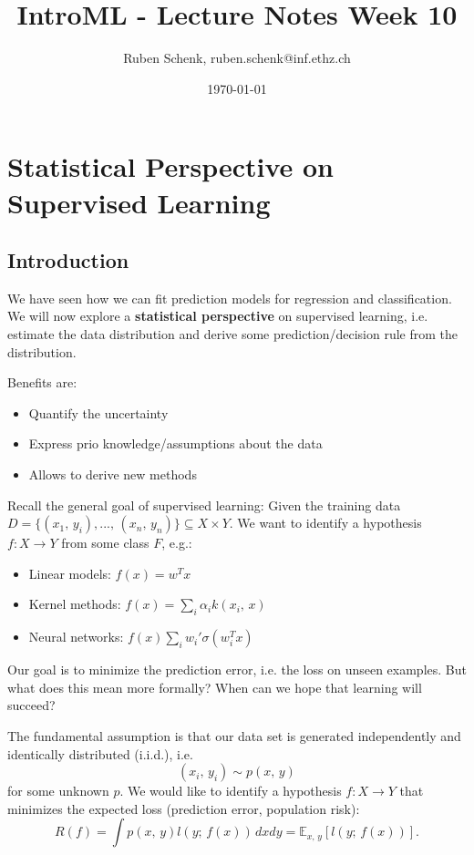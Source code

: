 \documentclass[a4paper]{extarticle}
\title{IntroML - Lecture Notes Week 10}
\author{Ruben Schenk, ruben.schenk@inf.ethz.ch}
\date{\today}
\begin{document}
\maketitle

\section{Statistical Perspective on Supervised Learning}

\subsection{Introduction}

We have seen how we can fit prediction models for regression and classification. We will now explore a \textbf{statistical perspective} on supervised learning, i.e. estimate the data distribution and derive some prediction/decision rule from the distribution.

Benefits are:
\begin{itemize}
    \item Quantify the uncertainty
    \item Express prio knowledge/assumptions about the data
    \item Allows to derive new methods
\end{itemize}

Recall the general goal of supervised learning: Given the training data $D = \{(x_1, \, y_i),..., \, (x_n, \, y_n)\} \subseteq X \times Y$. We want to identify a hypothesis $f : X \to Y$ from some class $F$, e.g.:
\begin{itemize}
    \item Linear models: $f(x) = w^Tx$
    \item Kernel methods: $f(x) = \sum_i \alpha_i k(x_i, \, x)$
    \item Neural networks: $f(x) \sum_i w_i' \sigma(w_i^T x)$
\end{itemize}
Our goal is to minimize the prediction error, i.e. the loss on unseen examples. But what does this mean more formally? When can we hope that learning will succeed?

The fundamental assumption is that our data set is generated independently and identically distributed (i.i.d.), i.e.
\[
    (x_i, \, y_i) \sim p(x, \, y)
\]
for some unknown $p$. We would like to identify a hypothesis $f: X \to Y$ that minimizes the expected loss (prediction error, population risk):
\[
    R(f) = \int p(x, \, y)l(y; \, f(x)) \, dxdy = \mathbb{E}_{x, \, y}[l(y; \, f(x))].
\]
\end{document}

